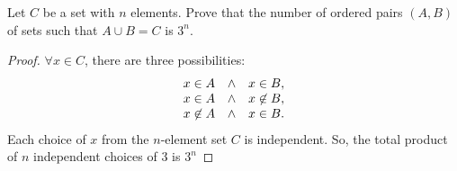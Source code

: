 \documentclass[../hw1]{subfiles}
\begin{document}
Let $C$ be a set with $n$ elements. Prove that the number of ordered pairs $(A,B)$ of sets such that $A \cup B = C$ is $3^n$.
\begin{proof}
	$\forall x \in C$, there are three possibilities:
	\[
		\begin{array}{l r}
			x \in A     & \land \quad x \in B,     \\
			x \in A     & \land \quad x \not\in B, \\
			x \not\in A & \land \quad x \in B.
		\end{array}
	\]
	Each choice of $x$ from the  $n$-element set  $C$ is independent.
	So, the total product of  $n$ independent choices of 3 is $3^n$
\end{proof}
\end{document}
